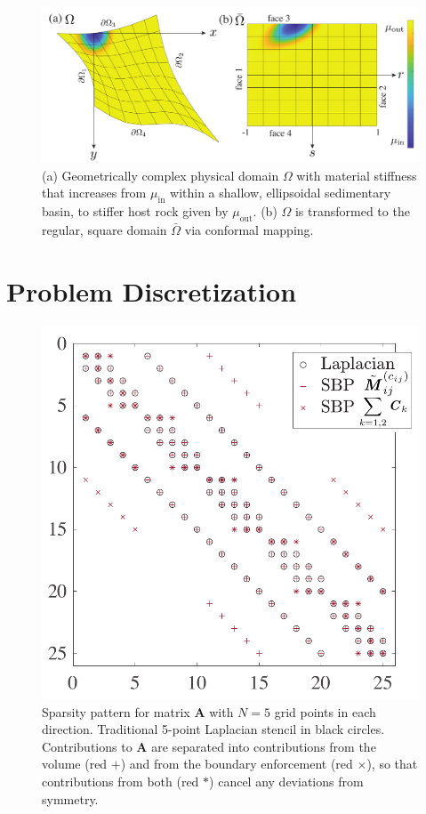 \begin{figure}
    \centering
     \includegraphics[width=\linewidth]{figures/grid_transformation.pdf}
    \caption{(a) Geometrically complex physical domain $\Omega$ with material stiffness that increases from $\mu_\text{in}$ within a shallow, ellipsoidal sedimentary basin, to stiffer host rock given by $\mu_\text{out}$.  (b) $\Omega$ is transformed to the regular, square domain $\bar{\Omega}$ via conformal mapping.} \label{fig:trans}
\end{figure}



\section{Problem Discretization}


\begin{figure}
    \centering
     \includegraphics[width=\linewidth]{figures/iccs_spy_3.pdf}
    \caption{Sparsity pattern for matrix $\boldsymbol{A}$ with $N = 5$ grid points in each direction.  Traditional 5-point Laplacian stencil in black circles. Contributions to $\boldsymbol{A}$ are separated into contributions from the volume (red $+$) and from the boundary enforcement (red $\times$), so that contributions from both (red $\ast$) cancel any deviations from symmetry.} 
    \label{fig:sparsity_A}
\end{figure}

